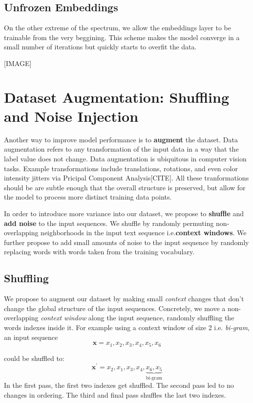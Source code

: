 \subsection{Unfrozen Embeddings}
On the other extreme of the spectrum, we allow the embeddings layer to be trainable from the very beggining.
This scheme makes the model converge in a small number of iterations but quickly starts to overfit the data.

[IMAGE]
\section{Dataset Augmentation: Shuffling and Noise Injection}
Another way to improve model performance is to \textbf{augment} the dataset.
Data augmentation refers to any transformation of the input data in a way that
the label value does not change. Data augmentation is ubiquitous in computer vision tasks. Example transformations include translations, rotations, and even color intensity jitters via Pricipal Component
Analysis[CITE]. All these tranformations should be are subtle enough that the overall structure is preserved, but
allow for the model to process more distinct training data points.

In order to introduce more variance into our dataset, we propose to \textbf{shuffle} and \textbf{add noise} to the input sequences.
We shuffle by randomly permuting non-overlapping neighborhoods in the input text sequence i.e.\textbf{context windows}.
We further propose to add small amounts of
noise to the input sequence by randomly replacing words with words taken from the training vocabulary.

\subsection{Shuffling}
We propose to augment our dataset by making small \textit{context} changes that don't change the global structure
of the input sequences. Concretely, we move a non-overlapping \textit{context window} along the input sequence, randomly
shuffling the words indexes inside it. For example using a context window of size 2 i.e. \textit{bi-gram}, an input sequence
\[\bm{x} = x_1, x_2, x_3, x_4, x_5, x_6\]

 could be shuffled to:
\[\bm{x}^{\prime} = x_2, x_1, x_3, x_4, \underbrace{x_6, x_5}_\text{bi-gram}\]
In the first pass, the first two indexes get shuffled. The second pass led to no changes in ordering. The third and
final pass shuffles the last two indexes.

